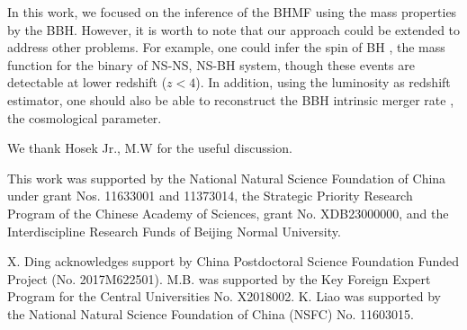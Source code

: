 \documentclass[twocolumn]{aastex62}
\begin{document}
In this work, we focused on the inference of the BHMF using the mass properties by the BBH. However, it is worth to note that our approach could be extended to address other problems. For example, one could infer the spin of BH \citep{Abbott2018b}, the mass function for the binary of NS-NS, NS-BH system, though these events are detectable at lower redshift ($z<4$). In addition, using the luminosity as redshift estimator, one should also be able to reconstruct the BBH intrinsic merger rate \citep{Fishbach2018}, the cosmological parameter.


\acknowledgments
We thank Hosek Jr., M.W for the useful discussion.

This work was supported by the National Natural Science Foundation of China under grant Nos. 11633001 and 11373014, the Strategic Priority Research Program of the Chinese Academy of Sciences, grant No. XDB23000000, and the Interdiscipline Research Funds of Beijing Normal University.

X. Ding acknowledges support by China Postdoctoral Science Foundation Funded Project (No. 2017M622501).
M.B. was supported by the Key Foreign Expert Program for the Central Universities No. X2018002.
K. Liao was supported by the National Natural Science Foundation of China (NSFC) No. 11603015.


%


\end{document}

